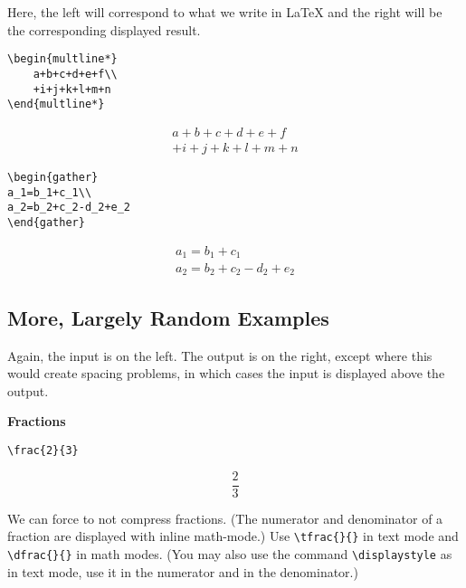 \documentclass[letterpaper,twoside,10pt]{article}
\begin{document}
Here, the left will correspond to what we write in {\LaTeX} and the right will be the corresponding displayed result.

\begin{multicols}{2}
\begin{verbatim}
\begin{multline*}
    a+b+c+d+e+f\\
    +i+j+k+l+m+n
\end{multline*}
\end{verbatim}

\begin{multline*}
    a+b+c+d+e+f\\
    +i+j+k+l+m+n
\end{multline*}
\end{multicols}


\begin{multicols}{2}
\begin{verbatim}
\begin{gather}
a_1=b_1+c_1\\
a_2=b_2+c_2-d_2+e_2
\end{gather}
\end{verbatim}

\begin{gather}
a_1=b_1+c_1\\
a_2=b_2+c_2-d_2+e_2
\end{gather}
\end{multicols}


\subsection{More, Largely Random Examples}

Again, the input is on the left. The output is on the right, except where this would create spacing problems, in which cases the input is displayed above the output.

\bigbreak\textbf{Fractions}

\begin{multicols}{2}
\begin{verbatim}
\frac{2}{3} 
\end{verbatim}
\[
 \frac{2}{3}
\]
\end{multicols}

We can force {\LaTeXe} to not compress fractions. (The numerator and denominator of a fraction are displayed with inline math-mode.) Use \verb!\tfrac{}{}! in text mode and \verb!\dfrac{}{}! in math modes. (You may also use the command \verb!\displaystyle! as in text mode, use it in the numerator and in the denominator.)
\end{document}
